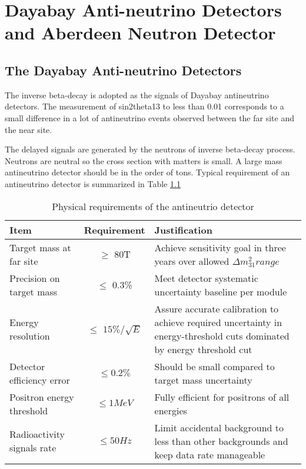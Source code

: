 \chapter{Dayabay Anti-neutrino Detectors and Aberdeen Neutron Detector}

\section{The Dayabay Anti-neutrino Detectors}
\label{sec:AD}

The inverse beta-decay is adopted as the signals of Dayabay antineutrino detectors.
The measurement of sin2theta13 to less than 0.01 corresponds to a small
difference in a lot of antineutrino events observed between the far site and
the near site.

The delayed signals are generated by the neutrons of inverse beta-decay process.
Neutrons are neutral so the cross section with matters is small.
A large mass antineutrino detector should be in the order of tons.
Typical requirement of an antineutrino detector is summarized in Table \ref{tab:ADRequirement}


\begin{table}
\centering
\caption{Physical requirements of the antineutrio detector\cite{TDR}}
\label{tab:ADRequirement}
\begin{tabular}{lcp{5.0cm}}
\hline
Item & Requirement & Justification\\
\hline
\hline
Target mass at far site &
$\geq$ 80T &
Achieve sensitivity goal in three years over allowed ${\Delta}m^{2}_31 range$ \\
\hline
Precision on target mass &
$\leq$ 0.3\% &
Meet detector systematic uncertainty baseline per module \\
\hline
Energy resolution &
$\leq$ $15\%/\sqrt{E}$ &
Assure accurate calibration to achieve required uncertainty in energy-threshold cuts dominated by energy threshold cut \\
\hline
Detector efficiency error &
$\leq 0.2\%$ &
Should be small compared to target mass uncertainty \\
\hline
Positron energy threshold &
$\leq 1MeV$ &
Fully efficient for positrons of all energies \\
Radioactivity signals rate &
$\leq 50 Hz$ &
Limit accidental background to less than other backgrounds and keep data rate manageable \\
\hline
\end{tabular}
\end{table}


